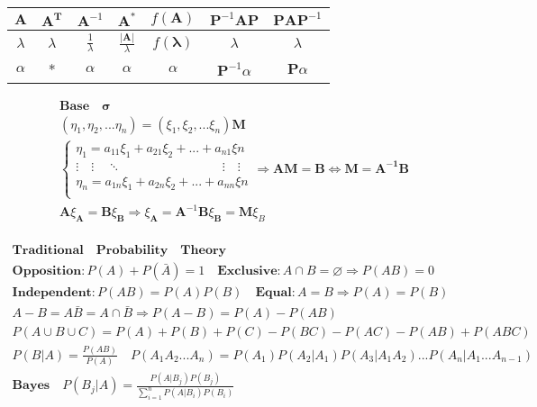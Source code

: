 \documentclass{article}
\begin{document}
\begin{tabular}{|c|c|c|c|c|c|c|}%
    \hline 
    $\mathbf{A}$ & $\mathbf{A}^{\mathbf{T}}$ & $\mathbf{A}^{-1}$ & $\mathbf{A}^{*}$ & $f(\mathbf{A})$ & $\mathbf{P}^{-1}\mathbf{A}\mathbf{P}$ & $\mathbf{P}\mathbf{A}\mathbf{P}^{-1}$ \\   
    \hline
    $\lambda$ & $\lambda$ & $\frac{1}{\lambda}$ & $\frac{|\mathbf{A}|}{\lambda}$ & $f(\mathbf{\lambda})$ & $\lambda$ & $\lambda$ \\ 
    \hline 
    $\alpha$ & * & $\alpha$ & $\alpha$ & $\alpha$ & $\mathbf{P}^{-1}\alpha$ & $\mathbf{P}\alpha$ \\ 
    \hline 
\end{tabular}

\clearpage
\begin{align*} 
    \bm{Base \quad \sigma} \\ 
    (\eta_{1},\eta_{2},...\eta_{n}) = (\xi_{1},\xi_{2},...\xi_{n})\mathbf{M} \\ 
    \left\{
        \begin{array}{rl}
            \eta_{1} = a_{11}\xi_{1} + a_{21}\xi_{2}+...+a_{n1}\xi{n} \\
            \vdots \quad \vdots \quad \ddots  \qquad \qquad \qquad \qquad \vdots \quad \vdots  \\
            \eta_{n} = a_{1n}\xi_{1} + a_{2n}\xi_{2}+...+a_{nn}\xi{n} \\
        \end{array} \Longrightarrow \mathbf{A}\mathbf{M} = \mathbf{B} \Longleftrightarrow \mathbf{M} = \mathbf{A^{-1}}\mathbf{B} 
    \right. \\ 
    \mathbf{A}\xi_{\mathbf{A}} = \mathbf{B}\xi_{\mathbf{B}} \Longrightarrow \xi_{\mathbf{A}} = \mathbf{A}^{-1}\mathbf{B}\xi_{\mathbf{B}} = \mathbf{M}\xi_{B}\\ 
\end{align*}

\clearpage 
\begin{align*}
    \bm{Traditional \quad Probability \quad Theory} \\ 
    \bm{Opposition}: P(A)+P(\bar{A}) = 1 \quad \bm{Exclusive}: A\cap B = \varnothing \Rightarrow P(AB)=0\\ 
    \bm{Independent}: P(AB) = P(A)P(B) \quad \bm{Equal}: A = B \Rightarrow P(A) = P(B)\\ 
    A - B = A\bar{B} = A \cap \bar{B} \Rightarrow P(A-B) = P(A) - P(AB) \\ 
    P(A \cup B \cup C) = P(A)+P(B)+P(C)-P(BC)-P(AC)-P(AB)+P(ABC) \\ 
    P(B|A) = \frac{P(AB)}{P(A)} \quad P(A_{1}A_{2}...A_{n}) = P(A_{1})P(A_{2}|A_{1})P(A_{3}|A_{1}A_{2})...P(A_{n}|A_{1}...A_{n-1}) \\
    \bm{Bayes} \quad P(B_{j}|A) = \frac{P(A|B_{j})P(B_{j})}{\sum_{i=1}^n P(A|B_{i})P(B_{i})}\\  
\end{align*}
\end{document}
